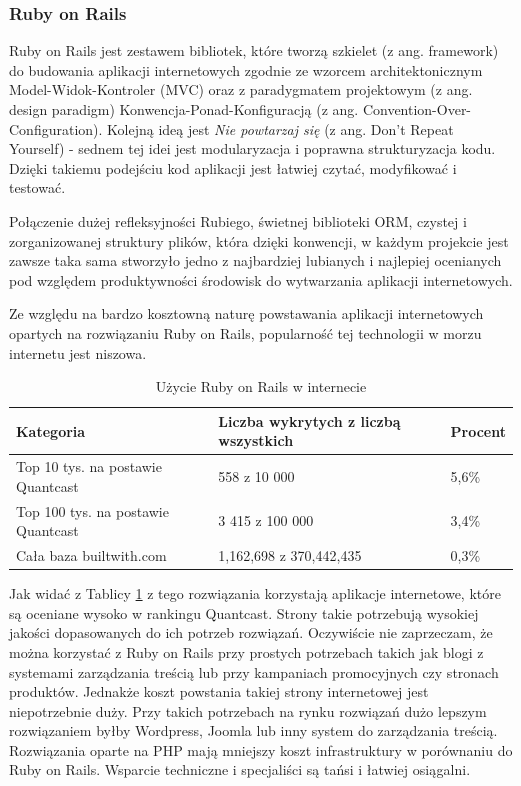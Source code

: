 \subsubsection{Ruby on Rails}
Ruby on Rails jest zestawem bibliotek, które tworzą szkielet (z ang. framework) do budowania aplikacji internetowych zgodnie ze wzorcem architektonicznym Model-Widok-Kontroler (MVC) oraz z paradygmatem projektowym (z ang. design paradigm) Konwencja-Ponad-Konfiguracją (z ang. Convention-Over-Configuration). Kolejną ideą jest \textit{Nie powtarzaj się} (z ang. Don't Repeat Yourself) - sednem tej idei jest modularyzacja i poprawna strukturyzacja kodu. Dzięki takiemu podejściu kod aplikacji jest łatwiej czytać, modyfikować i testować.


Połączenie dużej refleksyjności Rubiego, świetnej biblioteki ORM, czystej i zorganizowanej struktury plików, która dzięki konwencji, w każdym projekcie jest zawsze taka sama stworzyło jedno z najbardziej lubianych i najlepiej ocenianych pod względem produktywności środowisk do wytwarzania aplikacji internetowych.

Ze względu na bardzo kosztowną naturę powstawania aplikacji internetowych opartych na rozwiązaniu Ruby on Rails, popularność tej technologii w morzu internetu jest niszowa.\cite{TrendsBuiltWithRails}

\begin{table}
\caption{Użycie Ruby on Rails w internecie}
\label{table:rubyusage}
\begin{tabular}{ |l|l|l|  }
\hline
Kategoria & Liczba wykrytych z liczbą wszystkich & Procent \\
\hline
\hline
Top 10 tys. na postawie Quantcast & 558 z 10 000 & 5,6\% \\
\hline
Top 100 tys. na postawie Quantcast & 3 415 z 100 000 & 3,4\% \\
\hline
Cała baza builtwith.com & 1,162,698 z 370,442,435 & 0,3\% \\
\hline
\end{tabular}
\end{table}

Jak widać z Tablicy \ref{table:rubyusage} z tego rozwiązania korzystają aplikacje internetowe, które są oceniane wysoko w rankingu Quantcast. Strony takie potrzebują wysokiej jakości dopasowanych do ich potrzeb rozwiązań. Oczywiście nie zaprzeczam, że można korzystać z Ruby on Rails przy prostych potrzebach takich jak blogi z systemami zarządzania treścią lub przy kampaniach promocyjnych czy stronach produktów. Jednakże koszt powstania takiej strony internetowej jest niepotrzebnie duży. Przy takich potrzebach na rynku rozwiązań dużo lepszym rozwiązaniem byłby Wordpress, Joomla lub inny system do zarządzania treścią. Rozwiązania oparte na PHP mają mniejszy koszt infrastruktury w porównaniu do Ruby on Rails. Wsparcie techniczne i specjaliści są tańsi i łatwiej osiągalni.

